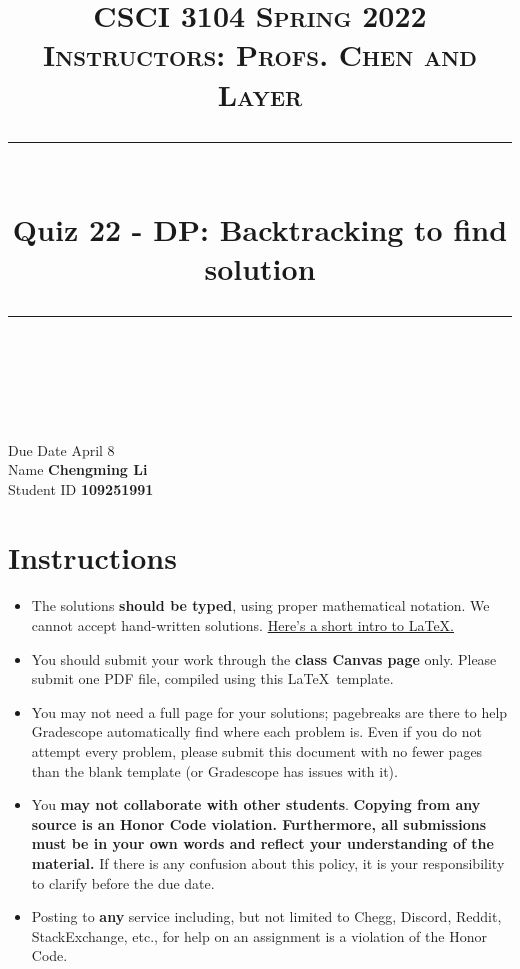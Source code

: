 \documentclass[11pt]{article}
\title{
\normalfont \normalsize 
\textsc{CSCI 3104 Spring 2022 \\ 
Instructors: Profs. Chen and Layer} \\
[10pt] 
\rule{\linewidth}{0.5pt} \\[6pt] 
\huge Quiz 22 - DP: Backtracking to find solution \\
\rule{\linewidth}{2pt}  \\[10pt]
}
\date{}
\theoremstyle{definition}
\theoremstyle{definition}
\theoremstyle{definition}
\begin{document}

\maketitle


\noindent
Due Date \dotfill April 8 \\
Name \dotfill \textbf{Chengming Li} \\
Student ID \dotfill \textbf{109251991} \\


\tableofcontents

\section{Instructions}
 \begin{itemize}
	\item The solutions \textbf{should be typed}, using proper mathematical notation. We cannot accept hand-written solutions. \href{http://ece.uprm.edu/~caceros/latex/introduction.pdf}{Here's a short intro to \LaTeX.}
	\item You should submit your work through the \textbf{class Canvas page} only. Please submit one PDF file, compiled using this \LaTeX \ template.
	\item You may not need a full page for your solutions; pagebreaks are there to help Gradescope automatically find where each problem is. Even if you do not attempt every problem, please submit this document with no fewer pages than the blank template (or Gradescope has issues with it).

	\item You \textbf{may not collaborate with other students}. \textbf{Copying from any source is an Honor Code violation. Furthermore, all submissions must be in your own words and reflect your understanding of the material.} If there is any confusion about this policy, it is your responsibility to clarify before the due date. 

	\item Posting to \textbf{any} service including, but not limited to Chegg, Discord, Reddit, StackExchange, etc., for help on an assignment is a violation of the Honor Code.

\end{itemize}
\end{document}
